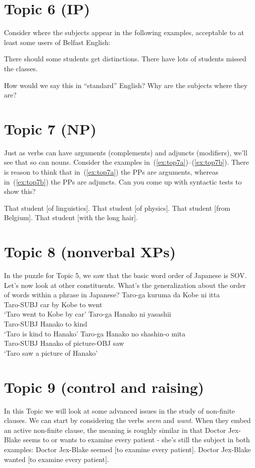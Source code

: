 \documentclass{article}
\begin{document}
\section{Topic 6 (IP)}
Consider where the subjects appear in the following examples, acceptable to at least some users of Belfast English:

\ea
    \ea There should some students get distinctions.
    \ex There have lots of students missed the classes.
    \z
\z

How would we say this in ``standard'' English? Why are the subjects where they are?

\section{Topic 7 (NP)}
Just as verbs can have arguments (complements) and adjuncts (modifiers), we'll see that so can nouns. Consider the examples in~(\ref{ex:top7a})--(\ref{ex:top7b}). There is reason to think that in~(\ref{ex:top7a}) the PPs are arguments, whereas in~(\ref{ex:top7b}) the PPs are adjuncts. Can you come up with syntactic tests to show this?

\ea \label{ex:top7a}
    \ea That student [of linguistics].
    \ex That student [of physics].
    \z
\ex \label{ex:top7b}
    \ea That student [from Belgium].
    \ex That student [with the long hair].
    \z
\z

\section{Topic 8 (nonverbal XPs)}
In the puzzle for Topic 5, we saw that the basic word order of Japanese is SOV. Let's now look at other constituents. What's the generalization about the order of words within a phrase in Japanese?
\ea
    \ea \gll Taro-ga kuruma	da Kobe ni itta\\
            Taro-SUBJ car by Kobe to went\\
        \glt `Taro went to Kobe by car'
    \ex \gll Taro-ga Hanako ni yasashii\\
            Taro-SUBJ Hanako to kind\\
        \glt `Taro is kind to Hanako'
    \ex \gll Taro-ga Hanako no shashin-o mita\\
            Taro-SUBJ Hanako of picture-OBJ saw\\
        \glt `Taro saw a picture of Hanako'
    \z
\z


\section{Topic 9 (control and raising)}
In this Topic we will look at some advanced issues in the study of non-finite clauses. We can start by considering the verbs \emph{seem} and \emph{want}. When they embed an active non-finite clause, the meaning is roughly similar in that Doctor Jex-Blake seems to or wants to examine every patient - she's still the subject in both examples:
\ea
    \ea Doctor Jex-Blake seemed [to examine every patient].
    \ex Doctor Jex-Blake wanted [to examine every patient].
    \z
\z
\end{document}
